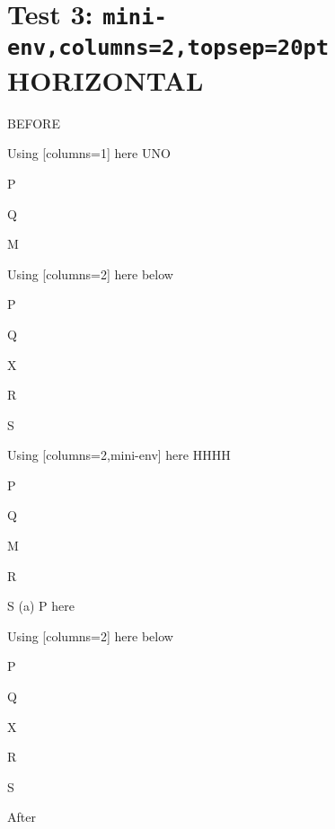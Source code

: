 \documentclass[10pt]{article}
\begin{document}
\newpage

\section{Test 3: \texttt{mini-env,columns=2,topsep=20pt} HORIZONTAL}

BEFORE
\begin{enumext}[columns=2]
\item Using [columns=1] here UNO
  \begin{enumext}[columns=1,topsep=20pt]%
     \item  P \item Q \item M %
  \end{enumext}

\item Using [columns=2] here below
\begin{enumext}[columns=2,topsep=20pt]%
     \item  P \item Q \item X  \item R \item S
  \end{enumext}

\columnbreak

\item Using [columns=2,mini-env] here HHHH
  \begin{enumext}[columns=2,mini-env={0.4\linewidth},topsep=20pt]%
    \item  P \item Q \item M \item R \item S
    \miniright
    (a) P here
  \end{enumext}

\item Using [columns=2] here below
\begin{enumext}[columns=2,topsep=20pt]%
     \item  P \item Q \item X  \item R \item S
  \end{enumext}

\end{enumext}
After
\end{document}
